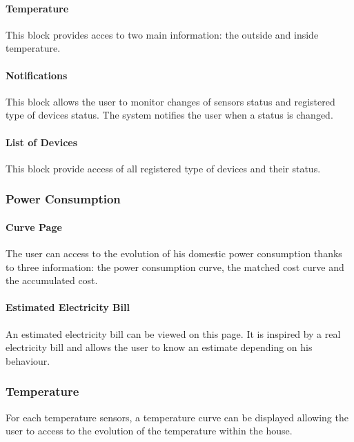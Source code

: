     \paragraph{Temperature}
    This block provides acces to two main information: the outside and inside temperature. 
    \paragraph{Notifications}
    This block allows the user to monitor changes of sensors status and registered type of devices status. The system notifies the user when a status is changed.
    \paragraph{List of Devices} %
    This block provide access of all registered type of devices and their status.

\subsubsection{Power Consumption}

    \paragraph{Curve Page}
    The user can access to the evolution of his domestic power consumption thanks to three information: the power consumption curve, the matched cost curve and the accumulated cost.
    
    \paragraph{Estimated Electricity Bill}
    An estimated electricity bill can be viewed on this page. It is inspired by a real electricity bill and allows the user to know an estimate depending on his behaviour.
\subsubsection{Temperature}
    For each temperature sensors, a temperature curve can be displayed allowing the user to access to the evolution of the temperature within the house. 
